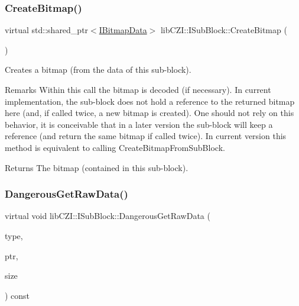\subsubsection{\texorpdfstring{Create\+Bitmap()}{CreateBitmap()}}
{\footnotesize\ttfamily virtual std\+::shared\+\_\+ptr$<$\hyperlink{classlib_c_z_i_1_1_i_bitmap_data}{I\+Bitmap\+Data}$>$ lib\+C\+Z\+I\+::\+I\+Sub\+Block\+::\+Create\+Bitmap (\begin{DoxyParamCaption}{ }\end{DoxyParamCaption})\hspace{0.3cm}{\ttfamily [pure virtual]}}

Creates a bitmap (from the data of this sub-\/block). \begin{DoxyRemark}{Remarks}
Within this call the bitmap is decoded (if necessary). In current implementation, the sub-\/block does not hold a reference to the returned bitmap here (and, if called twice, a new bitmap is created). One should not rely on this behavior, it is conceivable that in a later version the sub-\/block will keep a reference (and return the same bitmap if called twice). In current version this method is equivalent to calling Create\+Bitmap\+From\+Sub\+Block. 
\end{DoxyRemark}
\begin{DoxyReturn}{Returns}
The bitmap (contained in this sub-\/block). 
\end{DoxyReturn}
\mbox{\label{classlib_c_z_i_1_1_i_sub_block_a6f84a58437af59bac64a6147369ddae4}} 
\subsubsection{\texorpdfstring{Dangerous\+Get\+Raw\+Data()}{DangerousGetRawData()}\hspace{0.1cm}{\footnotesize\ttfamily [1/2]}}
{\footnotesize\ttfamily virtual void lib\+C\+Z\+I\+::\+I\+Sub\+Block\+::\+Dangerous\+Get\+Raw\+Data (\begin{DoxyParamCaption}\item[{\hyperlink{classlib_c_z_i_1_1_i_sub_block_a4dc4926ea65d8d20310b8b79ea76e108}{Mem\+Blk\+Type}}]{type,  }\item[{const void $\ast$\&}]{ptr,  }\item[{size\+\_\+t \&}]{size }\end{DoxyParamCaption}) const\hspace{0.3cm}{\ttfamily [pure virtual]}}

